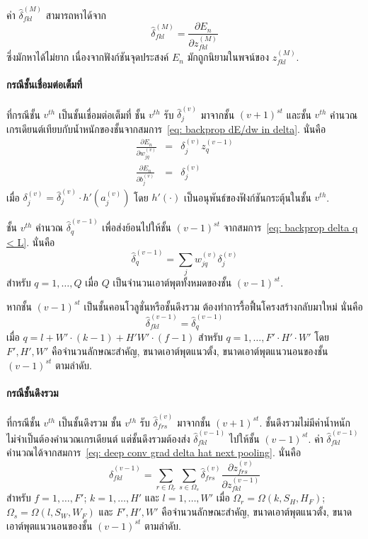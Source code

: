 ค่า $\hat{\delta}_{fkl}^{(M)}$ สามารถหาได้จาก
\[
\hat{\delta}_{fkl}^{(M)} = \frac{\partial E_n}{\partial z_{fkl}^{(M)}}
\nonumber 
\]
ซึ่งมักหาได้ไม่ยาก เนื่องจากฟังก์ชันจุดประสงค์ $E_n$ มักถูกนิยามในพจน์ของ $z_{fkl}^{(M)}$.

\paragraph{กรณีชั้นเชื่อมต่อเต็มที่}
ที่กรณีชั้น $v^{th}$ เป็นชั้นเชื่อมต่อเต็มที่
ชั้น $v^{th}$ รับ $\hat{\delta}_j^{(v)}$ มาจากชั้น $(v+1)^{st}$
และชั้น $v^{th}$ คำนวณเกรเดียนต์เทียบกับน้ำหนักของชั้นจากสมการ~\ref{eq: backprop dE/dw in delta}. %
นั่นคือ
\begin{eqnarray}
\frac{\partial E_n}{\partial w_{jq}^{(v)}} &=& \delta_j^{(v)} z_q^{(v-1)}
\nonumber \\
\frac{\partial E_n}{\partial b_j^{(v)}} &=& \delta_j^{(v)}
\nonumber
\end{eqnarray}
เมื่อ $\delta_j^{(v)} = \hat{\delta}_j^{(v)} \cdot h'(a_j^{(v)})$
โดย $h'(\cdot)$ เป็นอนุพันธ์ของฟังก์ชันกระตุ้นในชั้น $v^{th}$.

ชั้น $v^{th}$ คำนวณ $\hat{\delta}_q^{(v-1)}$ เพื่อส่งย้อนไปให้ชั้น $(v-1)^{st}$ จากสมการ~\ref{eq: backprop delta q < L}. %
นั่นคือ
\[
\hat{\delta}_q^{(v-1)} = \sum_j w_{jq}^{(v)} \delta_j^{(v)}
\nonumber 
\]
สำหรับ $q = 1, \ldots, Q$ 
เมื่อ $Q$ เป็นจำนวนเอาต์พุตทั้งหมดของชั้น $(v-1)^{st}$.

หากชั้น $(v-1)^{st}$ เป็นชั้นคอนโวลูชั่นหรือชั้นดึงรวม ต้องทำการรื้อฟื้นโครงสร้างกลับมาใหม่
นั่นคือ
\[
\hat{\delta}_{fkl}^{(v-1)} = \hat{\delta}_q^{(v-1)}
\nonumber
\]
เมื่อ 
$q = l + W' \cdot (k - 1) + H' W' \cdot (f - 1)$
สำหรับ $q = 1, \ldots, F' \cdot H' \cdot W'$
โดย $F', H', W'$ คือจำนวนลักษณะสำคัญ, ขนาดเอาต์พุตแนวตั้ง, ขนาดเอาต์พุตแนวนอนของชั้น $(v-1)^{st}$ ตามลำดับ.


\paragraph{กรณีชั้นดึงรวม}
ที่กรณีชั้น $v^{th}$ เป็นชั้นดึงรวม
ชั้น $v^{th}$ รับ $\hat{\delta}_{frs}^{(v)}$ มาจากชั้น $(v+1)^{st}$.
ชั้นดึงรวมไม่มีค่าน้ำหนัก ไม่จำเป็นต้องคำนวณเกรเดียนต์
แต่ชั้นดึงรวมต้องส่ง $\hat{\delta}_{fkl}^{(v-1)}$ ไปให้ชั้น $(v-1)^{st}$.
ค่า $\hat{\delta}_{fkl}^{(v-1)}$ คำนวณได้จากสมการ~\ref{eq: deep conv grad delta hat next pooling}.
นั่นคือ
\[
\hat{\delta}_{fkl}^{(v-1)}
= \sum_{r \in \Omega_r} \sum_{s \in \Omega_s} \hat{\delta}_{frs}^{(v)}
\frac{\partial z_{frs}^{(v)}}{\partial z_{fkl}^{(v-1)}}
\nonumber
\]
สำหรับ $f = 1, \ldots, F'$; $k = 1, \ldots, H'$ และ $l = 1, \ldots, W'$
เมื่อ $\Omega_r = \Omega(k, S_H, H_F)$; 
$\Omega_s = \Omega(l, S_W, W_F)$
และ $F', H', W'$ คือจำนวนลักษณะสำคัญ, ขนาดเอาต์พุตแนวตั้ง, ขนาดเอาต์พุตแนวนอนของชั้น $(v-1)^{st}$ ตามลำดับ.

